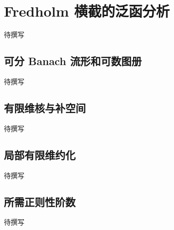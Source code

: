 
% 
% 

\section{Fredholm 横截的泛函分析}
\label{g4:sec:2302}

待撰写

\subsection{可分 Banach 流形和可数图册}
\label{g4:subsec:2302:01}
待撰写

\subsection{有限维核与补空间}
\label{g4:subsec:2302:02}
待撰写

\subsection{局部有限维约化}
\label{g4:subsec:2302:03}
待撰写

\subsection{所需正则性阶数}
\label{g4:subsec:2302:04}
待撰写
